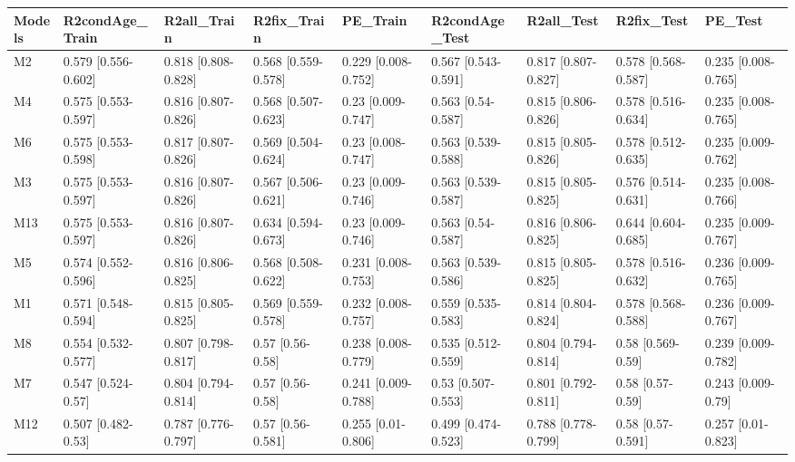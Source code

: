 \begin{table}[ht]
\centering
\begin{tabular}{lllllllll}
  \hline
Models & R2condAge\_Train & R2all\_Train & R2fix\_Train & PE\_Train & R2condAge\_Test & R2all\_Test & R2fix\_Test & PE\_Test \\ 
  \hline
M2 & 0.579 [0.556-0.602] & 0.818 [0.808-0.828] & 0.568 [0.559-0.578] & 0.229 [0.008-0.752] & 0.567 [0.543-0.591] & 0.817 [0.807-0.827] & 0.578 [0.568-0.587] & 0.235 [0.008-0.765] \\ 
  M4 & 0.575 [0.553-0.597] & 0.816 [0.807-0.826] & 0.568 [0.507-0.623] & 0.23 [0.009-0.747] & 0.563 [0.54-0.587] & 0.815 [0.806-0.826] & 0.578 [0.516-0.634] & 0.235 [0.008-0.765] \\ 
  M6 & 0.575 [0.553-0.598] & 0.817 [0.807-0.826] & 0.569 [0.504-0.624] & 0.23 [0.008-0.747] & 0.563 [0.539-0.588] & 0.815 [0.805-0.826] & 0.578 [0.512-0.635] & 0.235 [0.009-0.762] \\ 
  M3 & 0.575 [0.553-0.597] & 0.816 [0.807-0.826] & 0.567 [0.506-0.621] & 0.23 [0.009-0.746] & 0.563 [0.539-0.587] & 0.815 [0.805-0.825] & 0.576 [0.514-0.631] & 0.235 [0.008-0.766] \\ 
  M13 & 0.575 [0.553-0.597] & 0.816 [0.807-0.826] & 0.634 [0.594-0.673] & 0.23 [0.009-0.746] & 0.563 [0.54-0.587] & 0.816 [0.806-0.825] & 0.644 [0.604-0.685] & 0.235 [0.009-0.767] \\ 
  M5 & 0.574 [0.552-0.596] & 0.816 [0.806-0.825] & 0.568 [0.508-0.622] & 0.231 [0.008-0.753] & 0.563 [0.539-0.586] & 0.815 [0.805-0.825] & 0.578 [0.516-0.632] & 0.236 [0.009-0.765] \\ 
  M1 & 0.571 [0.548-0.594] & 0.815 [0.805-0.825] & 0.569 [0.559-0.578] & 0.232 [0.008-0.757] & 0.559 [0.535-0.583] & 0.814 [0.804-0.824] & 0.578 [0.568-0.588] & 0.236 [0.009-0.767] \\ 
  M8 & 0.554 [0.532-0.577] & 0.807 [0.798-0.817] & 0.57 [0.56-0.58] & 0.238 [0.008-0.779] & 0.535 [0.512-0.559] & 0.804 [0.794-0.814] & 0.58 [0.569-0.59] & 0.239 [0.009-0.782] \\ 
  M7 & 0.547 [0.524-0.57] & 0.804 [0.794-0.814] & 0.57 [0.56-0.58] & 0.241 [0.009-0.788] & 0.53 [0.507-0.553] & 0.801 [0.792-0.811] & 0.58 [0.57-0.59] & 0.243 [0.009-0.79] \\ 
  M12 & 0.507 [0.482-0.53] & 0.787 [0.776-0.797] & 0.57 [0.56-0.581] & 0.255 [0.01-0.806] & 0.499 [0.474-0.523] & 0.788 [0.778-0.799] & 0.58 [0.57-0.591] & 0.257 [0.01-0.823] \\ 

\end{tabular}
\end{table}
